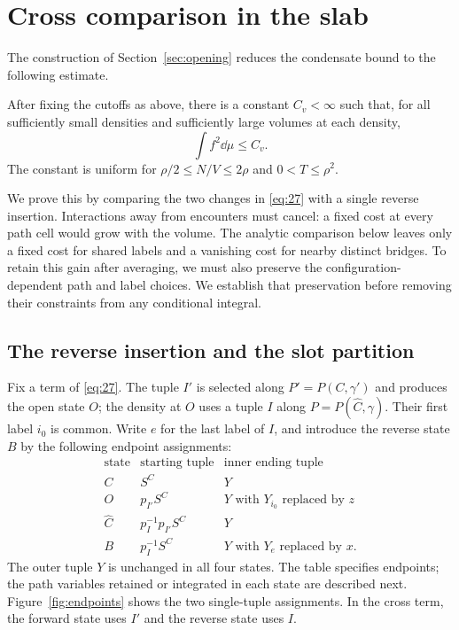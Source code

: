 \section{Cross comparison in the slab}\label{sec:comparison}


The construction of Section~\ref{sec:opening} reduces the condensate
bound to the following estimate.

\begin{proposition}\label{prop:second-moment}
After fixing the cutoffs as above, there is a constant $C_v<\infty$
such that, for all sufficiently small densities and sufficiently large
volumes at each density,
\[
                    \int f^2\dd\mu\le C_v.
\]
The constant is uniform for $\rho/2\le N/V\le2\rho$ and
$0<T\le\rho^2$.
\end{proposition}

We prove this by comparing the two changes in \eqref{eq:27} with a
single reverse insertion. Interactions away from encounters must cancel:
a fixed cost at every path cell would grow with the volume. The
analytic comparison below leaves only a fixed cost for shared labels
and a vanishing cost for nearby distinct bridges. To retain this gain
after averaging, we must also preserve the configuration-dependent
path and label choices. We establish that preservation before removing
their constraints from any conditional integral.

\subsection{The reverse insertion and the slot partition}

Fix a term of \eqref{eq:27}. The tuple $I'$ is selected along
$P'=P(C,\gamma')$ and produces the open state $O$; the density at $O$
uses a tuple $I$ along $P=P(\widehat C,\gamma)$. Their first label
$i_0$ is common. Write $e$ for the last label of $I$, and introduce
the reverse state $B$ by the following endpoint assignments:
\[
\begin{array}{c|c|c}
 \text{state}&\text{starting tuple}&\text{inner ending tuple}\\ \hline
 C&S^C&Y\\
 O&p_{I'}S^C&Y\text{ with }Y_{i_0}\text{ replaced by }z\\
 \widehat C&p_I^{-1}p_{I'}S^C&Y\\
 B&p_I^{-1}S^C&Y\text{ with }Y_e\text{ replaced by }x.
\end{array}
\]
The outer tuple $Y$ is unchanged in all four states. The table specifies
endpoints; the path variables retained or integrated in each state are
described next. Figure~\ref{fig:endpoints} shows the two single-tuple
assignments. In the cross term, the forward state uses $I'$ and the
reverse state uses $I$.


